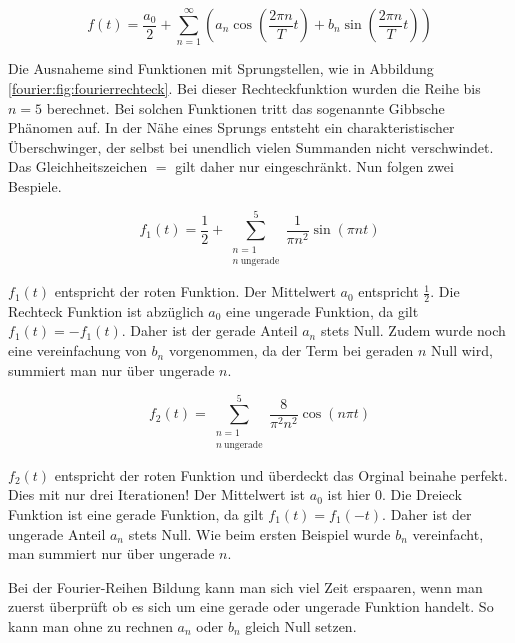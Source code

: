 \begin{equation}
f(t) = \frac{a_0}{2} + \sum_{n=1}^{\infty} \left( a_n \cos\left( \frac{2\pi n}{T} t \right) + b_n \sin\left( \frac{2\pi n}{T} t \right) \right)
\end{equation}


Die Ausnaheme sind Funktionen mit Sprungstellen, wie in Abbildung \ref{fourier:fig:fourierrechteck}.
Bei dieser Rechteckfunktion wurden die Reihe bis $n = 5$ berechnet. 
Bei solchen Funktionen tritt das sogenannte Gibbsche Phänomen auf.
In der Nähe eines Sprungs entsteht ein charakteristischer Überschwinger, der selbst bei unendlich vielen Summanden nicht verschwindet.
Das Gleichheitszeichen $=$ gilt daher nur eingeschränkt. 
Nun folgen zwei Bespiele.



\begin{equation}
	f_1(t) = \frac{1}{2} + \sum_{\substack{n=1 \\ n\ \text{ungerade}}}^{5} \frac{1}{\pi n^2} \sin\left( \pi n t \right)
\end{equation}

$f_1(t)$ entspricht der roten Funktion. 
Der Mittelwert $a_0$ entspricht $\frac{1}{2}$. 
Die Rechteck Funktion ist abzüglich $a_0$ eine ungerade Funktion, da gilt $f_1(t) = -f_1(t)$. 
Daher ist der gerade Anteil $a_n$ stets Null. 
Zudem wurde noch eine vereinfachung von $b_n$ vorgenommen, da der Term bei geraden $n$ Null wird, summiert man nur über ungerade $n$. 





\begin{equation}
	f_2(t) = \sum_{\substack{n=1 \\ n\ \text{ungerade}}}^{5} \frac{8}{\pi^2 n^2} \cos(n\pi t)
\end{equation}

$f_2(t)$ entspricht der roten Funktion und überdeckt das Orginal beinahe perfekt. 
Dies mit nur drei Iterationen!
Der Mittelwert ist $a_0$ ist hier 0. 
Die Dreieck Funktion ist eine gerade Funktion, da gilt $f_1(t) = f_1(-t)$. 
Daher ist der ungerade Anteil $a_n$ stets Null. 
Wie beim ersten Beispiel wurde $b_n$ vereinfacht, man summiert nur über ungerade $n$. 


Bei der Fourier-Reihen Bildung kann man sich viel Zeit erspaaren, wenn man zuerst überprüft ob es sich um eine gerade oder ungerade Funktion handelt.
So kann man ohne zu rechnen $a_n$ oder $b_n$ gleich Null setzen.




